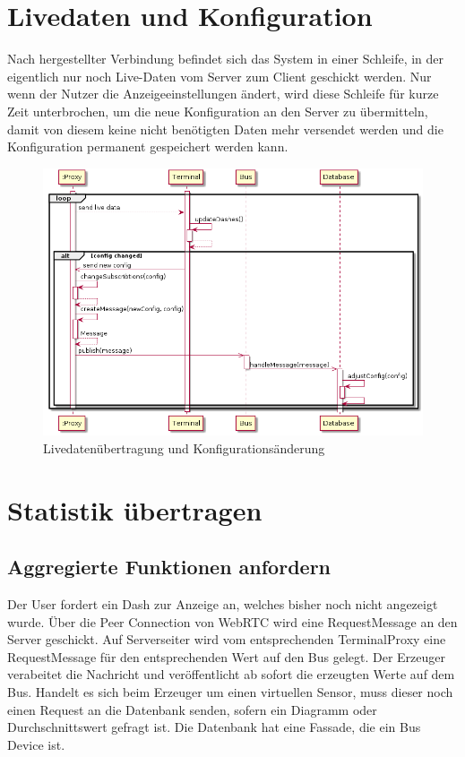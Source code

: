 \documentclass[entwurf.tex]{subfiles}
\begin{document}
  	\section{Livedaten und Konfiguration}
  	\label{Sequence:LiveDataNewConfig}
  		Nach hergestellter Verbindung befindet sich das System in einer Schleife, in der eigentlich nur noch Live-Daten vom Server zum Client geschickt werden. Nur wenn der Nutzer die Anzeigeeinstellungen ändert, wird diese Schleife für kurze Zeit unterbrochen, um die neue Konfiguration an den Server zu übermitteln, damit von diesem keine nicht benötigten Daten mehr versendet werden und die Konfiguration permanent gespeichert werden kann.
  		\begin{figure}[H]
  			\begin{center}
 				\includegraphics[width=\textwidth]{diagrams/ChangeDashConfig.png}
  				\caption{Livedatenübertragung und Konfigurationsänderung}
  			\end{center}
  		\end{figure}
  		
  	\section{Statistik übertragen}
  		\subsection{Aggregierte Funktionen anfordern}

      Der User fordert ein Dash zur Anzeige an, welches bisher noch nicht angezeigt wurde. Über die Peer Connection von WebRTC wird eine \elqq RequestMessage\erqq{} an den Server geschickt. Auf Serverseiter wird vom entsprechenden TerminalProxy eine RequestMessage für den entsprechenden Wert auf den Bus gelegt. Der Erzeuger verabeitet die Nachricht und veröffentlicht ab sofort die erzeugten Werte auf dem Bus. Handelt es sich beim Erzeuger um einen virtuellen Sensor, muss dieser noch einen Request an die Datenbank senden, sofern ein Diagramm oder Durchschnittswert gefragt ist. Die Datenbank hat eine Fassade, die ein Bus Device ist.
\end{document}
